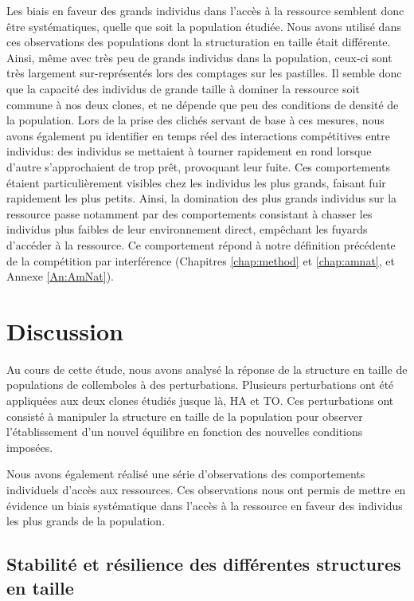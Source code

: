Les biais en faveur des grands individus dans l'accès à la ressource semblent
donc être systématiques, quelle que soit la population étudiée. Nous avons
utilisé dans ces observations des populations dont la structuration en taille était
différente.
Ainsi, même avec très peu de grands individus dans la population, ceux-ci sont
très largement sur-représentés lors des comptages sur les pastilles. Il semble
donc que la capacité des individus de grande taille à dominer la ressource soit
commune à nos deux clones, et ne dépende que peu des conditions de densité de la
population. Lors de la prise des clichés servant de base à ces mesures, nous
avons également pu identifier en temps réel des interactions
compétitives entre individus: des individus se
mettaient à tourner rapidement en rond lorsque d'autre s'approchaient de trop prêt, provoquant leur fuite. Ces comportements étaient
particulièrement visibles chez les individus les plus grands, faisant fuir
rapidement les plus petits. Ainsi, la
domination des plus grands individus sur la ressource passe notamment par des
comportements consistant à chasser les individus plus faibles de leur
environnement direct, empêchant les fuyards d'accéder à la ressource. Ce
comportement répond à notre définition précédente de la compétition par
interférence (Chapitres \ref{chap:method} et \ref{chap:amnat}, et Annexe
\ref{An:AmNat}).

\section{Discussion}

Au cours de cette étude, nous avons analysé la réponse de la structure en taille
de populations de collemboles à des perturbations. Plusieurs perturbations ont
été appliquées aux deux clones étudiés jusque là, HA et TO. Ces perturbations
ont consisté à manipuler la structure en taille de la population pour observer
l'établissement d'un nouvel équilibre en fonction des nouvelles conditions
imposées. 

Nous avons également réalisé une série d'observations des
comportements individuels d'accès aux ressources. Ces observations nous ont
permis de mettre en évidence un biais systématique dans l'accès à la ressource
en faveur des individus les plus grands de la population. 

\subsection{Stabilité et résilience des différentes structures en taille}


